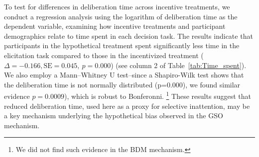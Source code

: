\documentclass[12pt]{article}
\begin{document}
To test for differences in deliberation time across incentive treatments, we conduct a regression analysis using the logarithm of deliberation time as the dependent variable, examining how incentive treatments and participant demographics relate to time spent in each decision task. The results indicate that participants in the hypothetical treatment spent significantly less time in the elicitation task compared to those in the incentivized treatment  (\(\Delta = -0.166, \text{SE} = 0.045,\ p = 0.000\)) (see column 2 of Table~\ref{tab:Time_spent}). We also employ a Mann–Whitney U test--since a Shapiro-Wilk test shows that the deliberation time is not normally distributed (p=0.000), we found similar evidence \(p = 0.0009\)), which is robust to Bonferonni. \footnote{We did not find such evidence in the BDM mechanism.} These results suggest that reduced deliberation time, used here as a proxy for selective inattention, may be a key mechanism underlying the hypothetical bias observed in the GSO mechanism.
\end{document}
